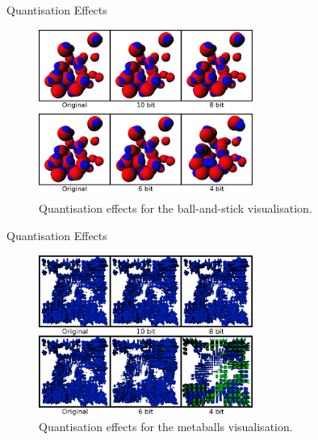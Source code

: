 \documentclass{beamer}
\begin{document}
\begin{frame}{Quantisation Effects}
\begin{figure}
  \centering
  \includegraphics[width=70mm]{min-images/ball-and-stick-4680.png}
  \caption{Quantisation effects for the ball-and-stick visualisation.}
\end{figure}
\end{frame}

\begin{frame}{Quantisation Effects}
\begin{figure}
  \centering
  \includegraphics[width=70mm]{min-images/metaballs-4680.png}
  \caption{Quantisation effects for the metaballs visualisation.}
\end{figure}
\end{frame}
\end{document}

